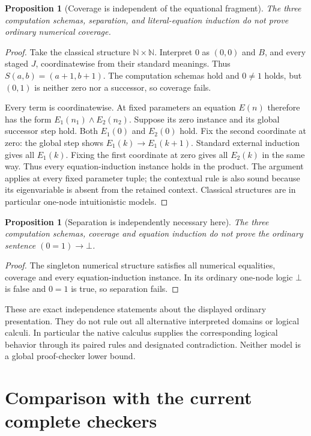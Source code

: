 \documentclass[11pt]{article}
\newtheorem{proposition}[theorem]{Proposition}
\theoremstyle{definition}
\begin{document}
\begin{proposition}[Coverage is independent of the equational fragment]
The three computation schemas, separation, and literal-equation
induction do not prove ordinary numerical coverage.
\end{proposition}
\begin{proof}
Take the classical structure $\mathbb N\times\mathbb N$. Interpret
$0$ as $(0,0)$ and $B$, and every staged $J$, coordinatewise from
their standard meanings. Thus $S(a,b)=(a+1,b+1)$. The computation
schemas hold and $0\ne1$ holds, but $(0,1)$ is neither zero nor
a successor, so coverage fails.

Every term is coordinatewise. At fixed parameters an equation $E(n)$
therefore has the form $E_1(n_1)\land E_2(n_2)$. Suppose its zero
instance and its global successor step hold. Both $E_1(0)$ and
$E_2(0)$ hold. Fix the second coordinate at zero: the global step
shows $E_1(k)\to E_1(k+1)$. Standard external induction gives all
$E_1(k)$. Fixing the first coordinate at zero gives all $E_2(k)$
in the same way. Thus every equation-induction instance holds in
the product. The argument applies at every fixed parameter tuple;
the contextual rule is also sound because its eigenvariable is absent
from the retained context. Classical structures are in particular
one-node intuitionistic models.
\end{proof}

\begin{proposition}[Separation is independently necessary here]
The three computation schemas, coverage and equation induction do not
prove the ordinary sentence $(0=1)\to\bot$.
\end{proposition}
\begin{proof}
The singleton numerical structure satisfies all numerical equalities,
coverage and every equation-induction instance. In its ordinary
one-node logic $\bot$ is false and $0=1$ is true, so separation fails.
\end{proof}

These are exact independence statements about the displayed ordinary
presentation. They do not rule out all alternative interpreted domains
or logical calculi. In particular the native calculus supplies the
corresponding logical behavior through its paired rules and designated
contradiction. Neither model is a global proof-checker lower bound.

\section{Comparison with the current complete checkers}
\label{sec:comparison}
\end{document}
